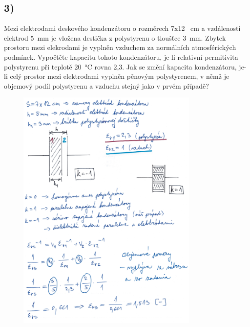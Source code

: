 \newpage


\subsection*{3)}
Mezi elektrodami deskového kondenzátoru o rozměrech 7x12 \SI{}{\centi\meter} a vzdálenosti elektrod \SI{5}{\milli\meter} je vložena destička z polystyrenu o tloušťce \SI{3}{\milli\meter}. Zbytek prostoru mezi elekrodami je vyplněn vzduchem za normálních atmosférických podmínek. Vypočtěte kapacitu tohoto kondenzátoru, je-li relativní permitivita polystyrenu při teplotě \SI{20}{\degreeCelsius} rovna 2,3. Jak se změní kapacita kondenzátoru, je-li celý prostor mezi elektrodami vyplněn pěnovým polystyrenem, v němž je objemový podíl polystyrenu a vzduchu stejný jako v prvém případě?

\begin{figure}[h]
    \centering
    \includegraphics*[width=0.80\textwidth]{images/diel3.jpg}
\end{figure}

\newpage

